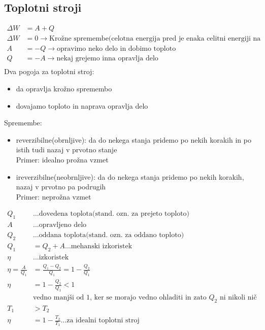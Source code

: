 {\color{indiagreen}\subsection{Toplotni stroji}}
\begin{align*}
	\Delta W &= A + Q\\
	\Delta W &= 0 \rightarrow \text{Krožne spremembe(celotna energija pred je enaka celitni energiji na koncu)}\\
	A &= -Q \rightarrow \text{opravimo neko delo in dobimo toploto}\\
	Q &= -A \rightarrow \text{nekaj grejemo inna opravlja delo}\\
\end{align*}
Dva pogoja za toplotni stroj:
\begin{itemize}
	\item da opravlja krožno spremembo
	\item dovajamo toploto in naprava opravlja delo
\end{itemize}
Spremembe:
\begin{itemize}
	\item reverzibilne(obrnljive): da do nekega stanja pridemo po nekih korakih in po istih tudi nazaj v prvotno stanje\\
	Primer: idealno prožna vzmet\\
	\item ireverzibilne(neobrnljive): da do nekega stanja pridemo po nekih korakih, nazaj v prvotno pa podrugih\\
	Primer: neprožna vzmet\\
\end{itemize}
\begin{align*}
	Q_1 &\dots \text{dovedena toplota(stand. ozn. za prejeto toploto)}\\
	A &\dots \text{opravljeno delo}\\
	Q_2 &\dots \text{oddana toplota(stand. ozn. za oddano toploto)}\\
	Q_1 &= Q_2 + A\dots \text{mehanski izkoristek}\\
	\eta &\dots \text{izkoristek}\\
	\eta = \frac{A}{Q_1} &= \frac{Q_1 - Q_2}{Q_1} = 1 - \frac{Q_2}{Q_1}\\
	\eta &= 1 - \frac{Q_2}{Q_1} < 1\\
	&\text{vedno manjši od 1, ker se morajo vedno ohladiti in zato $Q_2$ ni nikoli nič}\\
	T_1 &> T_2\\
	\eta &= 1 - \frac{T_2}{T_1} \dots \text{za idealni toplotni stroj}\\
\end{align*}

